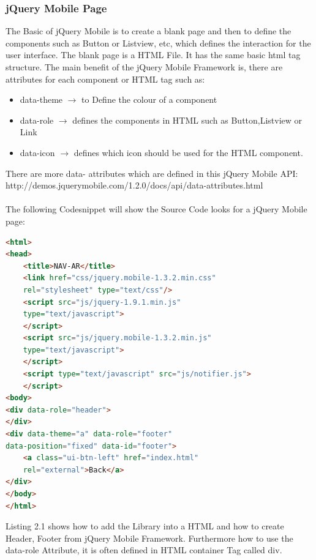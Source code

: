 \subsubsection{jQuery Mobile Page}
The Basic of jQuery Mobile is to create a blank page and then to define the components such as Button or Listview, etc, which defines the interaction for the user interface.  The blank page is a HTML File. It has the same basic html tag structure. The main benefit of the jQuery Mobile Framework is, there are attributes for each component or HTML tag such as:
\\
\begin{itemize}
\item data-theme $\rightarrow$ to Define the colour of a component
\item data-role $\rightarrow$ defines the components in HTML such as Button,Listview or Link
\item data-icon $\rightarrow$  defines which icon should be used for the HTML component.
\end{itemize}

There are more data- attributes which are defined in this jQuery Mobile API:  http://demos.jquerymobile.com/1.2.0/docs/api/data-attributes.html\\\\     
\newpage The following Codesnippet will show  the Source Code looks for a jQuery Mobile page:

\begin{lstlisting}[language=html,caption= jQuery Page,captionpos=b]
<html>
<head>
    <title>NAV-AR</title>
    <link href="css/jquery.mobile-1.3.2.min.css" 
    rel="stylesheet" type="text/css"/>
    <script src="js/jquery-1.9.1.min.js" 
    type="text/javascript">
    </script>
    <script src="js/jquery.mobile-1.3.2.min.js" 
    type="text/javascript">
    </script>
    <script type="text/javascript" src="js/notifier.js">
    </script>    
<body>
<div data-role="header">
</div>
<div data-theme="a" data-role="footer" 
data-position="fixed" data-id="footer">
    <a class="ui-btn-left" href="index.html" 
    rel="external">Back</a>
</div>
</body>
</html>

\end{lstlisting}

Listing 2.1 shows how to add the Library into a HTML and how to create Header, Footer from jQuery Mobile Framework. Furthermore how to use the data-role Attribute, it is often defined in HTML container Tag called div.\\\\


